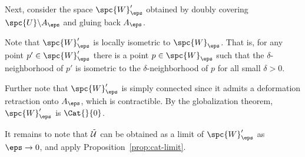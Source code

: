 Next, consider the space $\spc{W}'_\eps$ obtained by doubly covering $\spc{U}\backslash A_\eps$ and gluing back $A_\eps$.

Note that $\spc{W}'_\eps$ is locally isometric to $\spc{W}_\eps$. 
That is, for any point $p'\in\spc{W}'_\eps$ there is a point $p\in\spc{W}_\eps$ such that the $\delta$-neighborhood of $p'$ is isometric to the $\delta$-neighborhood of $p$ for all small $\delta>0$.

Further note that $\spc{W}'_\eps$ is simply connected since it admits a deformation retraction onto $A_\eps$, which is contractible.
By the globalization theorem, $\spc{W}'_\eps$ is $\Cat{}{0}$.

It remains to note that $\tilde{\mathcal{U}}$ can be obtained as a limit of $\spc{W}'_\eps$ as $\eps\to 0$, and apply Proposition~\ref{prop:cat-limit}.
\qeds


